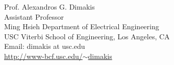 \documentclass[margin,line]{resume}
\begin{document}
\begin{resume}
Prof. Alexandros G. Dimakis \\
Assistant Professor \\
Ming Hsieh Department of Electrical Engineering \\
USC Viterbi School of Engineering, Los Angeles, CA \\
Email: dimakis at usc.edu \\
\href{http://www-bcf.usc.edu/~dimakis}{http://www-bcf.usc.edu/$\sim$dimakis}

\end{resume}
\end{document}
